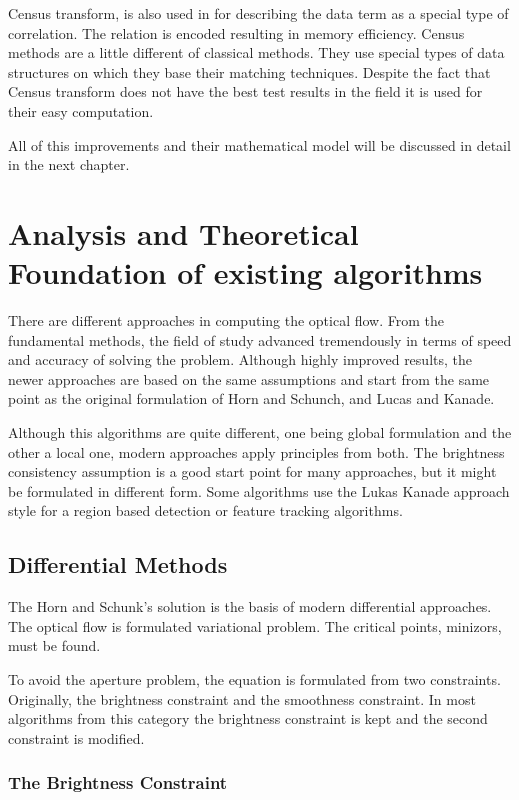 \documentclass[12pt,a4paper,twoside]{report}
\begin{document}
{Census transform, \cite{stein2004efficient} is also used in for describing the data term as a special type of correlation. The relation is encoded resulting in memory efficiency. Census methods are a little different of classical methods. They use special types of data structures on which they base their matching techniques. Despite the fact that Census transform does not have the best test results in the field it is used for their easy computation.

All of this improvements and their mathematical model will be discussed in detail in the next chapter.   



\chapter{Analysis and Theoretical Foundation of existing algorithms}
\label{ch:analysis}
There are different approaches in computing the optical flow. From the fundamental methods, the field of study advanced tremendously in terms of speed and accuracy of solving the problem. Although highly improved results, the newer approaches are based on the same assumptions and start from the same point as the original formulation of Horn and Schunch, and Lucas and Kanade. 

Although this algorithms are quite different, one being global formulation and the other a local one, modern approaches apply principles from both. The brightness consistency assumption is a good start point for many approaches, but it might be formulated in different form. Some algorithms use the Lukas Kanade approach style for a region based detection or feature tracking algorithms.




\section{Differential Methods}
The Horn and Schunk's solution is the basis of modern differential approaches. The optical flow is formulated variational problem. The critical points, minizors, must be found.

To avoid the aperture problem, the equation is formulated from two constraints. Originally, the brightness constraint and the smoothness constraint. In most algorithms from this category the brightness constraint is kept and the second constraint is modified.
\subsection{The Brightness Constraint} \label{BrightnessConstr}

}
\end{document}
